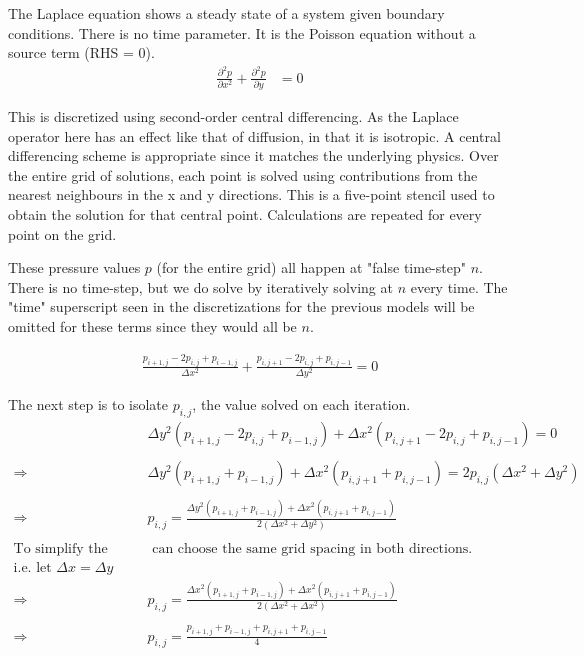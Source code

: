 \documentclass[11pt]{article}
\begin{document}
{The Laplace equation shows a steady state of a system given boundary
conditions. There is no time parameter. It is the Poisson equation without a source term (RHS = 0).
\begin{align}
\frac{\partial^2 p}{\partial x^2} + \frac{\partial^2 p}{\partial y} &= 0
\label{laplace}
\end{align}

This is discretized using second-order central differencing. As the Laplace operator here
has an effect like that of diffusion, in that it is isotropic. A central differencing scheme
is appropriate since it matches the underlying physics. Over the entire grid of solutions,
each point is solved using contributions from the nearest neighbours in the x and y directions.
This is a five-point stencil used to obtain the solution for that central point. Calculations
are repeated for every point on the grid.

These pressure values $p$ (for the entire grid) all happen
at "false time-step" $n$. There is no time-step, but we do solve by iteratively solving at $n$
every time. The "time" superscript seen in the discretizations for the previous models will be
omitted for these terms since they would all be $n$.

\begin{align}
\frac{p_{i+1,j} - 2p_{i,j} + p_{i-1,j}}{\Delta x^2}
 + \frac{p_{i,j+1} - 2p_{i,j} + p_{i,j-1}}{\Delta y^2} = 0
\label{discrete_laplace}
\end{align}

The next step is to isolate $p_{i,j}$, the value solved on each iteration.
\begin{align}
&\Delta y^2 (p_{i+1,j} - 2p_{i,j} + p_{i-1,j}) + \Delta x^2 (p_{i,j+1} - 2p_{i,j} + p_{i,j-1}) = 0
	\nonumber \\ \nonumber \\
\Rightarrow ~~&
\Delta y^2 (p_{i+1,j} + p_{i-1,j}) + \Delta x^2 (p_{i,j+1} + p_{i,j-1})
 = 2p_{i,j} (\Delta x^2 + \Delta y^2)
	\nonumber \\ \nonumber \\
\Rightarrow ~~&
p_{i,j} = \frac{\Delta y^2 (p_{i+1,j} + p_{i-1,j}) + \Delta x^2 (p_{i,j+1} + p_{i,j-1})}
			 {2(\Delta x^2 + \Delta y^2)}
	\\ \nonumber \\
\text{To simplify the formula, we}&
\text{ can choose the same grid spacing in both directions.~~~~~~~~~~~~~~~~~~~~~}\nonumber\\
\text{i.e. let } \Delta x = \Delta y ~~~~~~~~~~~~~~&
	\nonumber \\
\Rightarrow ~~&
p_{i,j} = \frac{\Delta x^2 (p_{i+1,j} + p_{i-1,j}) + \Delta x^2 (p_{i,j+1} + p_{i,j-1})}
			 {2(\Delta x^2 + \Delta x^2)}
	\nonumber \\ \nonumber \\
\Rightarrow ~~&
p_{i,j} = \frac{p_{i+1,j} + p_{i-1,j} + p_{i,j+1} + p_{i,j-1}}
			 {4}
\label{transposed_laplace}
\end{align}

}
\end{document}
